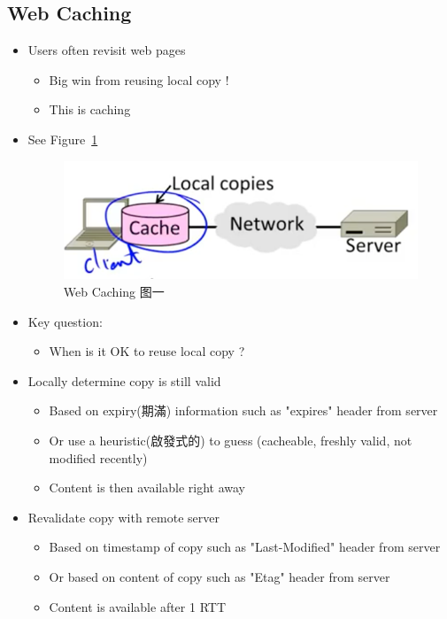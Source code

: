 \documentclass[12pt]{ctexart}   %
\begin{document}
	\subsection{Web Caching}
	\begin{itemize}
		\item Users often revisit web pages
		\begin{itemize}
			\item Big win from reusing local copy !
			\item This is caching
		\end{itemize}
		\item See Figure~\ref{fig:8-6-2}
		  
		 \begin{figure}[h!] %
		\centering
		 \includegraphics[scale=0.7]{images/8-6-2}
		\caption{ Web Caching 图一}
		 \label{fig:8-6-2}
		 \end{figure}
		 
		 \item Key question:
		\begin{itemize}
			\item When is it OK to reuse local copy ?
		\end{itemize}
		
		\item Locally determine copy is still valid
		\begin{itemize}
			\item Based on expiry(期滿) information such as "expires" header from server
			\item Or use a heuristic(啟發式的) to guess (cacheable, freshly valid, not modified recently)
			\item Content is then available right away
		\end{itemize}
		
		\item Revalidate copy with remote server
		\begin{itemize}
			\item Based on timestamp of copy such as "Last-Modified" header from server
			\item Or based on content of copy such as "Etag" header from server
			\item Content is available after 1 RTT
		\end{itemize}
		

\end{itemize}
\end{document}
